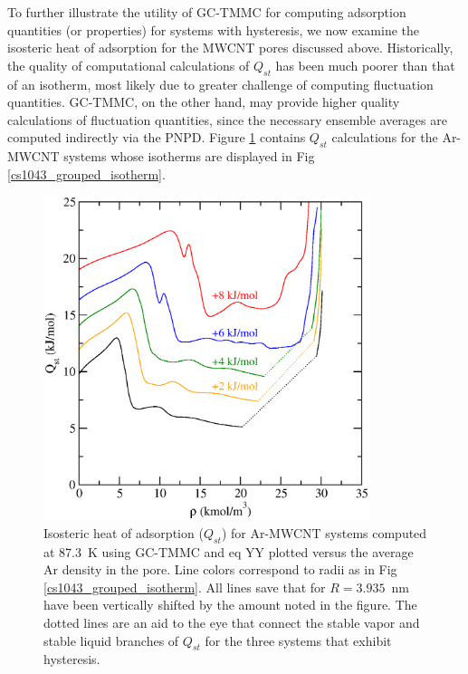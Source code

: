 To further illustrate the utility of GC-TMMC for computing adsorption quantities (or properties) for systems with hysteresis, we now examine the isosteric heat of adsorption for the MWCNT pores discussed above. Historically, the quality of computational calculations of $Q_{st}$ has been much poorer than that of an isotherm, most likely due to greater challenge of computing fluctuation quantities. GC-TMMC, on the other hand, may provide higher quality calculations of fluctuation quantities, since the necessary ensemble averages are computed indirectly via the PNPD. Figure \ref{cs1043_grouped_qst} contains $Q_{st}$ calculations for the Ar-MWCNT systems whose isotherms are displayed in Fig \ref{cs1043_grouped_isotherm}.
%
\begin{figure}
 \includegraphics[clip=true,width=0.85\textwidth]{Figures/grouped_qst_1043_vrho}
  \caption{Isosteric heat of adsorption ($Q_{st}$) for Ar-MWCNT systems computed at 87.3~K using GC-TMMC and eq YY plotted versus the average Ar density in the pore. Line colors correspond to radii as in Fig \ref{cs1043_grouped_isotherm}. All lines save that for $R=3.935$~nm have been vertically shifted by the amount noted in the figure. The dotted lines are an aid to the eye that connect the stable vapor and stable liquid branches of $Q_{st}$ for the three systems that exhibit hysteresis.}
  \label{cs1043_grouped_qst}
\end{figure}
%
